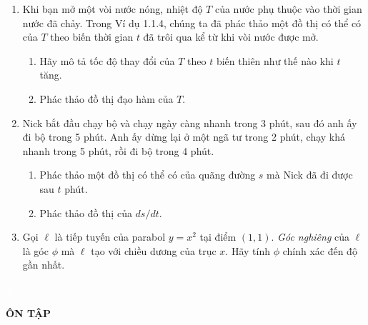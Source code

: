 \hfill
\begin{minipage}[t]{0.485\textwidth}
\begin{enumerate}[label=\textbf{\arabic*.}, leftmargin=1.5em, start=66, itemsep=6pt, topsep=0pt]
    \item Khi bạn mở một vòi nước nóng, nhiệt độ $T$ của nước phụ thuộc vào thời gian nước đã chảy. Trong Ví dụ 1.1.4, chúng ta đã phác thảo một đồ thị có thể có của $T$ theo biến thời gian $t$ đã trôi qua kể từ khi vòi nước được mở.
    \begin{enumerate}[label=(\alph*), leftmargin=1.6em, itemsep=1.5pt, topsep=2pt]
        \item Hãy mô tả tốc độ thay đổi của $T$ theo $t$ biến thiên như thế nào khi $t$ tăng.
        \item Phác thảo đồ thị đạo hàm của $T$.
    \end{enumerate}

    \item Nick bắt đầu chạy bộ và chạy ngày càng nhanh trong 3 phút, sau đó anh ấy đi bộ trong 5 phút. Anh ấy dừng lại ở một ngã tư trong 2 phút, chạy khá nhanh trong 5 phút, rồi đi bộ trong 4 phút.
    \begin{enumerate}[label=(\alph*), leftmargin=1.6em, itemsep=1.5pt, topsep=2pt]
        \item Phác thảo một đồ thị có thể có của quãng đường $s$ mà Nick đã đi được sau $t$ phút.
        \item Phác thảo đồ thị của $ds/dt$.
    \end{enumerate}

    \item Gọi $\ell$ là tiếp tuyến của parabol $y = x^2$ tại điểm $(1, 1)$. \textit{Góc nghiêng} của $\ell$ là góc $\phi$ mà $\ell$ tạo với chiều dương của trục $x$. Hãy tính $\phi$ chính xác đến độ gần nhất.
\end{enumerate}
\end{minipage}

\vspace{10pt}

\noindent
\begingroup
\setlength{\fboxsep}{0pt}%
\colorbox{bannerdark}{\parbox[c][22pt][c]{24pt}{\centering\textcolor{white}{\fontsize{13}{15}\selectfont\textbf{\textsf{2}}}}}%
\colorbox{bannerlight}{\parbox[c][22pt][c]{\dimexpr\textwidth-24pt\relax}{\hspace{10pt}\fontsize{12}{14}\selectfont\textbf{\textsf{ÔN TẬP}}}}%
\endgroup

